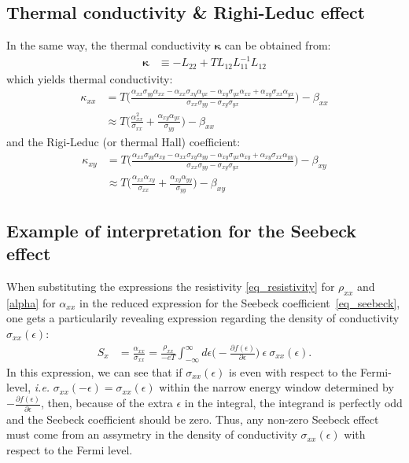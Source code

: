 \documentclass[notitlepage,11pt,nofootinbib]{revtex4-1}
\begin{document}
\subsection{Thermal conductivity \& Righi-Leduc effect}
In the same way, the thermal conductivity $\boldsymbol{\kappa}$ can be obtained from:
\begin{align}
\boldsymbol{\kappa} &\equiv -L_{22} + TL_{12}L_{11}^{-1}L_{12}
\end{align}
which yields thermal conductivity:
\begin{align}
\kappa_{xx} 
&=
T\Big(\frac{
\alpha_{xx}\sigma_{yy}\alpha_{xx} -
\alpha_{xx}\sigma_{xy}\alpha_{yx} -
\alpha_{xy}\sigma_{yx}\alpha_{xx} +
\alpha_{xy}\sigma_{xx}\alpha_{yx}
}{\sigma_{xx}\sigma_{yy}-\sigma_{xy}\sigma_{yx}}
\Big) - \beta_{xx}
\\ &
\approx
T\Big( \frac{
\alpha_{xx}^2
}{\sigma_{xx}}
+
\frac{
\alpha_{xy}\alpha_{yx}
}{\sigma_{yy}}
\Big) - \beta_{xx}
\end{align}
and the Rigi-Leduc (or thermal Hall) coefficient:
\begin{align}
\kappa_{xy} 
&=
T\Big(\frac{
\alpha_{xx}\sigma_{yy}\alpha_{xy} -
\alpha_{xx}\sigma_{xy}\alpha_{yy} -
\alpha_{xy}\sigma_{yx}\alpha_{xy} +
\alpha_{xy}\sigma_{xx}\alpha_{yy}
}{\sigma_{xx}\sigma_{yy}-\sigma_{xy}\sigma_{yx}}
\Big) - \beta_{xy}
\\ &
\approx
T\Big( \frac{
\alpha_{xx}\alpha_{xy}
}{\sigma_{xx}}
+
\frac{
\alpha_{xy}\alpha_{yy}
}{\sigma_{yy}}
\Big) - \beta_{xy}
\end{align}

\subsection{Example of interpretation for the Seebeck effect}
When substituting the expressions the resistivity \eqref{eq_resistivity} for $\rho_{xx}$ and \eqref{alpha} for $\alpha_{xx}$ in the reduced expression for the Seebeck coefficient~\eqref{eq_seebeck}, one gets a particularily revealing expression regarding the density of conductivity $\sigma_{xx}(\epsilon)$:
\begin{align}
S_x 
&=
\frac{\alpha_{xx}}{\sigma_{xx}}
=
\frac{\rho_{xx}}{-eT}
\int_{-\infty}^{\infty}d\epsilon
\Big(-\frac{\partial f(\epsilon)}{\partial \epsilon}\Big)
\ \epsilon\ 
\sigma_{xx}(\epsilon).
\label{eq_seebeck_explicit}
\end{align}
In this expression, we can see that if $\sigma_{xx}(\epsilon)$ is even with respect to the Fermi-level, \emph{i.e.} $\sigma_{xx}(-\epsilon) = \sigma_{xx}(\epsilon)$ within the narrow energy window determined by $-\frac{\partial f(\epsilon)}{\partial \epsilon}$, then, because of the extra $\epsilon$ in the integral, the integrand is perfectly odd and the Seebeck coefficient should be zero. Thus, any non-zero Seebeck effect must come from an assymetry in the density of conductivity $\sigma_{xx}(\epsilon)$ with respect to the Fermi level.
\end{document}
